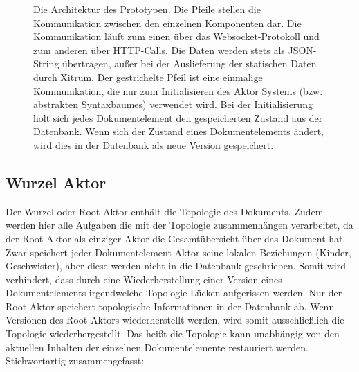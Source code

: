  
\begin{figure}[h!]
\centering
\advance\leftskip-2.5cm
\caption{ Die Architektur des Prototypen. Die Pfeile stellen die Kommunikation zwischen den einzelnen Komponenten dar. Die Kommunikation läuft zum einen über das Websocket-Protokoll und zum anderen über HTTP-Calls. Die Daten werden stets als JSON-String übertragen, außer bei der Auslieferung der statischen Daten durch Xitrum. Der gestrichelte Pfeil ist eine einmalige Kommunikation, die nur zum Initialisieren des Aktor Systems (bzw. abstrakten Syntaxbaumes) verwendet wird. Bei der Initialisierung holt sich jedes Dokumentelement den gespeicherten Zustand aus der Datenbank. Wenn sich der Zustand eines Dokumentelements ändert, wird dies in der Datenbank als neue Version gespeichert. }\label{architektur-fig}
\end{figure}
 
\subsection{Wurzel Aktor}\label{}
 
Der Wurzel oder Root Aktor enthält die Topologie des Dokuments. Zudem werden hier alle Aufgaben die mit der Topologie zusammenhängen verarbeitet, da der Root Aktor als einziger Aktor die Gesamtübersicht über das Dokument hat. Zwar speichert jeder Dokumentelement-Aktor seine lokalen Beziehungen (Kinder, Geschwister), aber diese werden nicht in die Datenbank geschrieben. Somit wird verhindert, dass durch eine Wiederherstellung einer Version eines Dokumentelements irgendwelche Topologie-Lücken aufgerissen werden. Nur der Root Aktor speichert topologische Informationen in der Datenbank ab. Wenn Versionen des Root Aktors wiederherstellt werden, wird somit ausschließlich die Topologie wiederhergestellt. Das heißt die Topologie kann unabhängig von den aktuellen Inhalten der einzelnen Dokumentelemente restauriert werden. Stichwortartig zusammengefasst:

